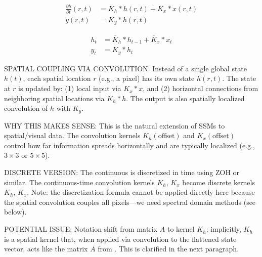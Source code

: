 \begin{minipage}[t]{.45\linewidth}
  \begin{subequations}
    \label{eq:conv_ssm_continuous}
    \begin{align}
    \label{eq:conv_ssm_continuous:1}
      \frac{\partial h}{\partial t}(r,t) &= K_h \ast h(r, t) + K_x \ast x(r, t) \\
      y(r, t) &= K_y \ast h(r, t)
    \end{align}
  \end{subequations}
\end{minipage}%
\begin{minipage}[t]{.45\linewidth}
  \begin{subequations}
    \label{eq:conv_ssm_discrete}
    \begin{align}
    \label{eq:conv_ssm_discrete:1}
      h_{t} &= \overline{K}_h \ast h_{t-1} + \overline{K}_x \ast x_t \\
    \label{eq:conv_ssm_discrete:2}
      y_t &= K_y \ast h_t
    \end{align}
  \end{subequations}
\end{minipage}

\begin{ThomasAnnotation}
  SPATIAL COUPLING VIA CONVOLUTION. Instead of a single global state $h(t)$, each spatial location $r$ (e.g., a pixel) has its own state $h(r,t)$. The state at $r$ is updated by: (1) local input via $K_x \ast x$, and (2) horizontal connections from neighboring spatial locations via $K_h \ast h$. The output is also spatially localized convolution of $h$ with $K_y$.
  
  WHY THIS MAKES SENSE: This is the natural extension of SSMs to spatial/visual data. The convolution kernels $K_h(\text{offset})$ and $K_x(\text{offset})$ control how far information spreads horizontally and are typically localized (e.g., $3 \times 3$ or $5 \times 5$).
  
  DISCRETE VERSION: The continuous  is discretized in time using ZOH or similar. The continuous-time convolution kernels $K_h$, $K_x$ become discrete kernels $\overline{K}_h$, $\overline{K}_x$. Note: the discretization formula  cannot be applied directly here because the spatial convolution couples all pixels---we need spectral domain methods (see below).
  
  POTENTIAL ISSUE: Notation shift from matrix $A$ to kernel $K_h$: implicitly, $K_h$ is a spatial kernel that, when applied via convolution to the flattened state vector, acts like the matrix $A$ from . This is clarified in the next paragraph.
\end{ThomasAnnotation}


